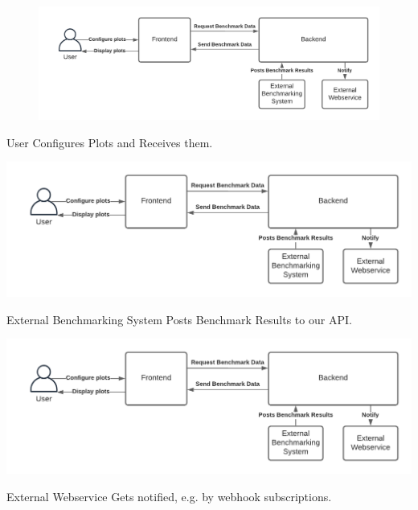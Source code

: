 \begin{frame}
    \begin{figure}[H]
        \includegraphics[width=\textwidth]{images/systemmodel_light_overview.pdf}
        \label{fig:lightoverview}
    \end{figure}

    \begin{block}{User}
        Configures Plots and Receives them.
    \end{block}
\end{frame}


\begin{frame}
    \includegraphics[width=\textwidth]{images/systemmodel_light_overview.pdf}

    \begin{block}{External Benchmarking System}
        Posts Benchmark Results to our API.
    \end{block}
\end{frame}


\begin{frame}
    \includegraphics[width=\textwidth]{images/systemmodel_light_overview.pdf}

    \begin{block}{External Webservice}
        Gets notified, e.g. by webhook subscriptions.
    \end{block}
\end{frame}